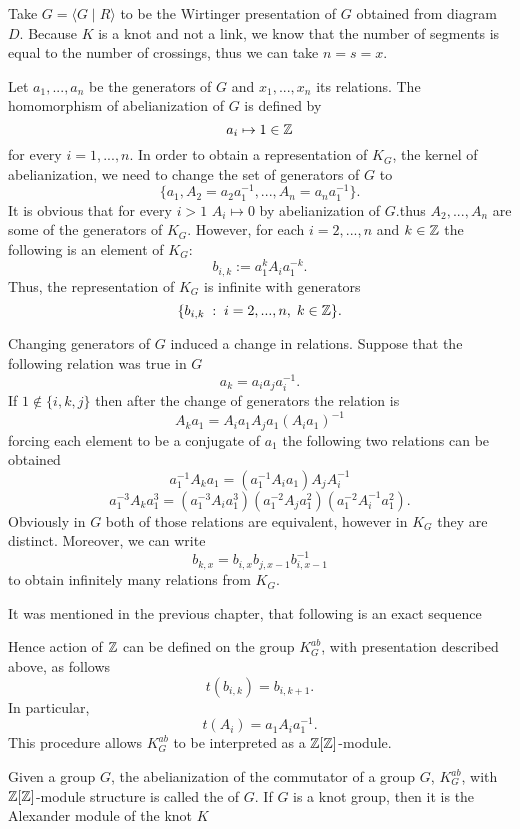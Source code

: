 Take $G=\langle G\;|\;R\rangle$ to be the Wirtinger presentation of $G$ obtained from diagram $D$. Because $K$ is a knot and not a link, we know that the number of segments is equal to the number of crossings, thus we can take $n=s=x$.

Let $a_1,...,a_n$ be the generators of $G$ and $x_1,...,x_n$ its relations. The homomorphism of abelianization of $G$ is defined by 
$$a_i\mapsto 1\in\operatorname{\mathbb{Z}}$$ 
for every $i=1,...,n$. In order to obtain a representation of $K_G$, the kernel of abelianization, we need to change the set of generators of $G$ to 
$$\{a_1, A_2=a_2a_1^{-1},..., A_n=a_na_1^{-1}\}.$$
It is obvious that for every $i>1$ $A_i\mapsto0$ by abelianization of $G$.thus $A_2,...,A_n$ are some of the generators of $K_G$. However, for each $i=2,...,n$ and $k\in\operatorname{\mathbb{Z}}$ the following is an element of $K_G$:
$$b_{i, k}:=a_1^k A_i a_1^{-k}.$$
Thus, the representation of $K_G$ is infinite with generators 
$$\{b_{i,k}\;:\;i=2,...,n,\;k\in\operatorname{\mathbb{Z}}\}.$$

Changing generators of $G$ induced a change in relations. Suppose that the following relation was true in $G$
$$a_k=a_ia_ja_i^{-1}.$$
If $1\notin\{i,k,j\}$ then after the change of generators the relation is
$$ A_ka_1 = A_ia_1 A_ja_1 (A_ia_1)^{-1}
$$
forcing each element to be a conjugate of $a_1$ the following two relations can be obtained
$$ a_1^{-1}A_ka_1=(a_1^{-1} A_i a_1)A_jA_i^{-1}
$$
$$
a_1^{-3} A_k a_1^3 = (a_1^{-3} A_i a_1^3) (a_1^{-2} A_j a_1^2) (a_1^{-2} A_i^{-1} a_1^2).
$$
Obviously in $G$ both of those relations are equivalent, however in $K_G$ they are distinct. Moreover, we can write 
$$
b_{k, x}=b_{i, x}b_{j, x-1}b_{i, x-1}^{-1}
$$
to obtain infinitely many relations from $K_G$.

It was mentioned in the previous chapter, that following is an exact sequence
\begin{center}
\end{center}
Hence action of $\operatorname{\mathbb{Z}}$ can be defined on the group $K^{ab}_G$, with presentation described above, as follows 
$$t(b_{i, k})=b_{i, k+1}.$$
In particular, 
$$t(A_i)=a_1 A_i a_1^{-1}.$$
This procedure allows $K_G^{ab}$ to be interpreted as a $\operatorname{\mathbb{Z}}[\operatorname{\mathbb{Z}}]$-module.

\begin{definition}
  Given a group $G$, the abelianization of the commutator of a group $G$, $K_G^{ab}$, with $\operatorname{\mathbb{Z}}[\operatorname{\mathbb{Z}}]$-module structure is called the  of $G$. If $G$ is a knot group, then it is the Alexander module of the knot $K$
\end{definition}

